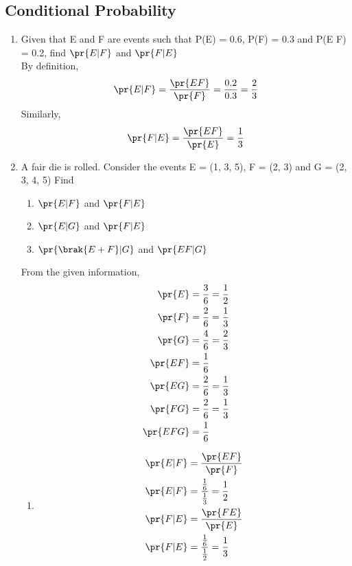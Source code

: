 \subsection{Conditional Probability}
\renewcommand{\theequation}{\theenumi}
\begin{enumerate}[label=\thesubsection.\arabic*.,ref=\thesubsection.\theenumi]

\item Given that E and F are events such that P(E) = 0.6, P(F) = 0.3 and P(E  F) = 0.2, find $\pr{E|F}$ and $\pr{F|E}$\\
\solution By definition,
\begin{align}
\pr{E|F} = \frac{\pr{EF}}{\pr{F}} = \frac{0.2}{0.3} = \frac{2}{3}
\end{align}
%
Similarly,
\begin{align}
\pr{F|E} = \frac{\pr{EF}}{\pr{E}} = \frac{1}{3}
\end{align}


\item A fair die is rolled. Consider the events E =  (1, 3, 5), F = (2, 3) and G = (2, 3, 4, 5) Find\\
\begin{enumerate}
\item  $\pr{E|F}$ and $\pr{F|E}$
\item  $\pr{E|G}$ and  $\pr{F|E}$
\item   $\pr{\brak{E+F}|G}$ and  $\pr{EF|G}$ 
\end{enumerate}
\solution
%

From the given information,
	\begin{align}
	\pr{E} &= \frac{3}{6} = \frac{1}{2} \\
	\pr{F} &= \frac{2}{6} = \frac{1}{3} \\	
	\pr{G} &= \frac{4}{6} = \frac{2}{3} \\	
	\pr{E F} &= \frac{1}{6}\\
	\pr{E G} &= \frac{2}{6}= \frac{1}{3}\\
	\pr{F G} &= \frac{2}{6}= \frac{1}{3}\\
	\pr{E F G} &= \frac{1}{6}
\end{align}
\begin{enumerate}
\item	
\begin{align}
	\pr{E|F} &= \frac{\pr{E F}}{\pr{F}}\\
	\pr{E|F} &= \frac{\frac{1}{6}}{\frac{1}{3}} = \frac{1}{2}\\
	\pr{F|E} &= \frac{\pr{F E}}{\pr{E}}\\
	\pr{F|E} &= \frac{\frac{1}{6}}{\frac{1}{2}} = \frac{1}{3}
	\end{align}


\end{enumerate}
\end{enumerate}
